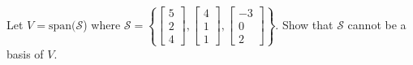 \documentclass{ximera}
\begin{document}
\begin{example}
Let $V=\mbox{span} (\mathcal{S}$) where $\mathcal{S}=\left\{\begin{bmatrix}5\\2\\4\end{bmatrix},\begin{bmatrix}4\\1\\1\end{bmatrix},\begin{bmatrix}-3\\0\\2\end{bmatrix}\right\}$.  Show that $\mathcal{S}$ cannot be a basis of $V$.

\end{example}
\end{document}

